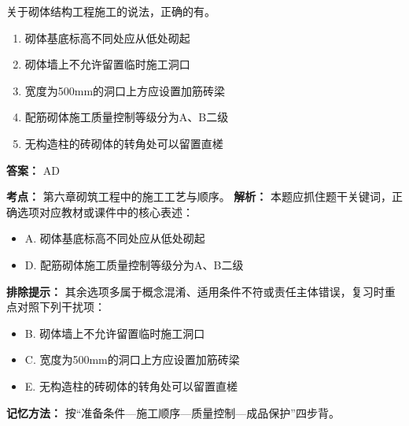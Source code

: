 \documentclass[UTF8,fontset=fandol,11pt]{ctexart}
\begin{document}
\begin{quizbox}[title={第 25 题}]
关于砌体结构工程施工的说法，正确的有。\\
\begin{enumerate}[label=\Alph*.]
\item 砌体基底标高不同处应从低处砌起
\item 砌体墙上不允许留置临时施工洞口
\item 宽度为500mm的洞口上方应设置加筋砖梁
\item 配筋砌体施工质量控制等级分为A、B二级
\item 无构造柱的砖砌体的转角处可以留置直槎
\end{enumerate}
\textbf{答案：} AD
\vspace{0.25em}
\begin{answerbox}[title={考点解析}]
\textbf{考点：} 第六章砌筑工程中的施工工艺与顺序。
\textbf{解析：} 本题应抓住题干关键词，正确选项对应教材或课件中的核心表述：
\begin{itemize}
\item A. 砌体基底标高不同处应从低处砌起
\item D. 配筋砌体施工质量控制等级分为A、B二级
\end{itemize}
\textbf{排除提示：} 其余选项多属于概念混淆、适用条件不符或责任主体错误，复习时重点对照下列干扰项：
\begin{itemize}
\item B. 砌体墙上不允许留置临时施工洞口
\item C. 宽度为500mm的洞口上方应设置加筋砖梁
\item E. 无构造柱的砖砌体的转角处可以留置直槎
\end{itemize}
\textbf{记忆方法：} 按“准备条件—施工顺序—质量控制—成品保护”四步背。
\end{answerbox}
\end{quizbox}

\vspace{0.2em}
\end{document}
